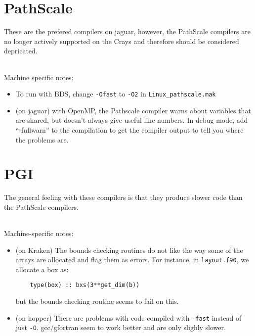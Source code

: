 \section{PathScale}

These are the prefered compilers on jaguar, however, the PathScale
compilers are no longer actively supported on the Crays and therefore
should be considered depricated. 


\ \\
Machine specific notes:
\begin{itemize}

\item  To run with BDS, change {\tt -Ofast} to {\tt -O2} in {\tt Linux\_pathscale.mak}

\item (on jaguar) with OpenMP, the Pathscale compiler warns about
  variables that are shared, but doesn't always give useful line
  numbers.  In debug mode, add ``-fullwarn'' to the compilation to get
  the compiler output to tell you where the problems are. 


\end{itemize}


\section{PGI}

The general feeling with these compilers is that they produce slower
code than the PathScale compilers.

\ \\
Machine-specific notes:
\begin{itemize}

\item (on Kraken) The bounds checking routines do not like the way some of
the arrays are allocated and flag them as errors.  For instance, in
{\tt layout.f90}, we allocate a box as:
\begin{verbatim}
    type(box) :: bxs(3**get_dim(b))
\end{verbatim}
but the bounds checking routine seems to fail on this.

\item (on hopper) There are problems with code compiled with {\tt -fast}
instead of just {\tt -O}.  gcc/gfortran seem to work better and 
are only slighly slower.
\end{itemize}



